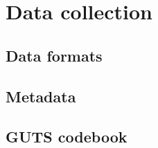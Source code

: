 \documentclass[
  letterpaper,
  DIV=11,
  numbers=noendperiod]{scrreprt}
\begin{document}
\part{Data collection}

\hypertarget{data-formats}{%
\chapter{Data formats}\label{data-formats}}

\hypertarget{metadata}{%
\chapter{Metadata}\label{metadata}}

\hypertarget{guts-codebook}{%
\chapter{GUTS codebook}\label{guts-codebook}}
\end{document}
